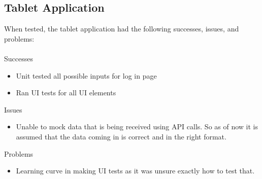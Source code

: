 \subsection{Tablet Application}
When tested, the tablet application had the following successes, issues, and problems:\\\\
Successes
\begin{itemize}
\item Unit tested all possible inputs for log in page
\item Ran UI tests for all UI elements
\end{itemize}
Issues
\begin{itemize}
\item Unable to mock data that is being received using API calls.  So as of now it is assumed that the data coming in is correct and in the right format.
\end{itemize}
Problems
\begin{itemize}
\item Learning curve in making UI tests as it was unsure exactly how to test that.
\end{itemize}

